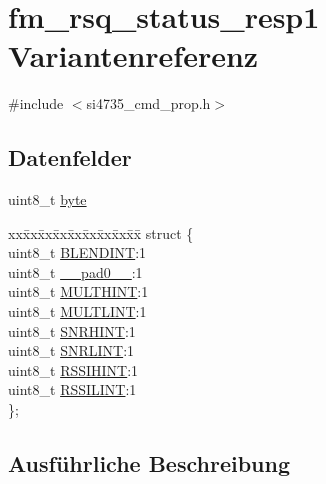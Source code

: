 \hypertarget{unionfm__rsq__status__resp1}{}\section{fm\+\_\+rsq\+\_\+status\+\_\+resp1 Variantenreferenz}
\label{unionfm__rsq__status__resp1}


{\ttfamily \#include $<$si4735\+\_\+cmd\+\_\+prop.\+h$>$}

\subsection*{Datenfelder}
\begin{DoxyCompactItemize}
\item 
uint8\+\_\+t \hyperlink{unionfm__rsq__status__resp1_a96f44d20f1dbf1c8785a7bc99a46164c}{byte}
\item 
\begin{tabbing}
xx\=xx\=xx\=xx\=xx\=xx\=xx\=xx\=xx\=\kill
struct \{\\
\>uint8\_t \hyperlink{unionfm__rsq__status__resp1_a321d37434c6c05e542b0a4efa740ef92}{BLENDINT}:1\\
\>uint8\_t \hyperlink{unionfm__rsq__status__resp1_a8b4eebe79ded0459acec2f4950102ba3}{\_\_pad0\_\_}:1\\
\>uint8\_t \hyperlink{unionfm__rsq__status__resp1_aad2227d372dbc81eb060b01d2e985806}{MULTHINT}:1\\
\>uint8\_t \hyperlink{unionfm__rsq__status__resp1_a794b7b3c9ce09a60905ee23ab161a6b0}{MULTLINT}:1\\
\>uint8\_t \hyperlink{unionfm__rsq__status__resp1_a2cdca35f06dea322da5a107085b827a5}{SNRHINT}:1\\
\>uint8\_t \hyperlink{unionfm__rsq__status__resp1_a4c9935138813a5ab2dd82191c1003156}{SNRLINT}:1\\
\>uint8\_t \hyperlink{unionfm__rsq__status__resp1_a3f94db5fbbe3d52c506832d6a29885d1}{RSSIHINT}:1\\
\>uint8\_t \hyperlink{unionfm__rsq__status__resp1_ab4d0978420a010d6e43e4c2e5bca697c}{RSSILINT}:1\\
\}; \\

\end{tabbing}\end{DoxyCompactItemize}


\subsection{Ausführliche Beschreibung}


